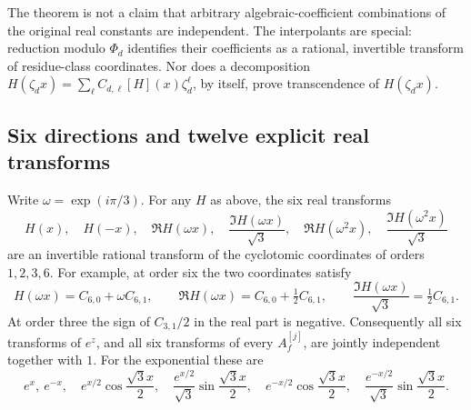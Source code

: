 The theorem is not a claim that arbitrary algebraic-coefficient
combinations of the original real constants are independent.  The
interpolants are special: reduction modulo $\Phi_d$ identifies their
coefficients as a rational, invertible transform of residue-class
coordinates.  Nor does a decomposition
$H(\zeta_d x)=\sum_\ell C_{d,\ell}[H](x)\zeta_d^\ell$, by itself,
prove transcendence of $H(\zeta_d x)$.

\subsection{Six directions and twelve explicit real transforms}

Write $\omega=\exp(i\pi/3)$.  For any $H$ as above, the six real
transforms
\begin{equation}\label{eq:six-transforms-v5}
 H(x),\quad H(-x),\quad
 \Re H(\omega x),\quad\frac{\Im H(\omega x)}{\sqrt3},\quad
 \Re H(\omega^2x),\quad\frac{\Im H(\omega^2x)}{\sqrt3}
\end{equation}
are an invertible rational transform of the cyclotomic coordinates
of orders $1,2,3,6$.  For example, at order six the two coordinates
satisfy
\[
 H(\omega x)=C_{6,0}+\omega C_{6,1},\qquad
 \Re H(\omega x)=C_{6,0}+\tfrac12 C_{6,1},\qquad
 \frac{\Im H(\omega x)}{\sqrt3}=\tfrac12 C_{6,1}.
\]
At order three the sign of $C_{3,1}/2$ in the real part is negative.
Consequently all six transforms of $e^z$, and all six transforms
of every $A_f^{[j]}$, are jointly independent together with $1$.
For the exponential these are
\[
 e^x,\ e^{-x},\quad
 e^{x/2}\cos\frac{\sqrt3x}{2},\quad
 \frac{e^{x/2}}{\sqrt3}\sin\frac{\sqrt3x}{2},\quad
 e^{-x/2}\cos\frac{\sqrt3x}{2},\quad
 \frac{e^{-x/2}}{\sqrt3}\sin\frac{\sqrt3x}{2}.
\]

